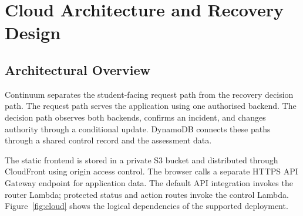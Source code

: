 \chapter{Cloud Architecture and Recovery Design}
\section{Architectural Overview}
Continuum separates the student-facing request path from the recovery decision path. The request path serves the application using one authorised backend. The decision path observes both backends, confirms an incident, and changes authority through a conditional update. DynamoDB connects these paths through a shared control record and the assessment data.

The static frontend is stored in a private S3 bucket and distributed through CloudFront using origin access control. The browser calls a separate HTTPS API Gateway endpoint for application data. The default API integration invokes the router Lambda; protected status and action routes invoke the control Lambda. Figure~\ref{fig:cloud} shows the logical dependencies of the supported deployment.

